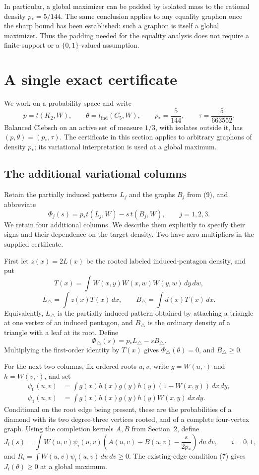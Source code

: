 \documentclass[11pt]{amsart}
\theoremstyle{definition}
\theoremstyle{remark}
\begin{document}
In particular, a global maximizer can be padded by isolated mass to the
rational density \(p_*=5/144\). The same conclusion applies to any
equality graphon once the sharp bound has been established: such a graphon
is itself a global maximizer. Thus the padding needed for the equality
analysis does not require a finite-support or a \(\{0,1\}\)-valued
assumption.

\section{A single exact certificate}

We work on a probability space and write
\[
 p=t(K_2,W),\qquad\theta=t_{\mathrm{ind}}(C_5,W),\qquad
 p_*=\frac5{144},\qquad\tau=\frac5{663552}.
\]
Balanced Clebsch on an active set of measure \(1/3\), with isolates outside
it, has \((p,\theta)=(p_*,\tau)\). The certificate in this section applies
to arbitrary graphons of density \(p_*\); its variational interpretation
is used at a global maximum.

\subsection{The additional variational columns}

Retain the partially induced patterns \(L_j\) and the graphs \(B_j\) from
(9), and abbreviate
\[
 \Phi_j(s)=p_*t(L_j,W)-s\,t(B_j,W),\qquad j=1,2,3.
\]
We retain four additional columns. We describe them explicitly to specify
their signs and their dependence on the target density. Two have zero
multipliers in the supplied certificate.

First let \(z(x)=2L(x)\) be the rooted labeled induced-pentagon density,
and put
\[
 T(x)=\int W(x,y)W(x,w)W(y,w)\,dy\,dw,
\]
\[
 L_\triangle=\int z(x)T(x)\,dx,\qquad
 B_\triangle=\int d(x)T(x)\,dx.
\]
Equivalently, \(L_\triangle\) is the partially induced pattern obtained
by attaching a triangle at one vertex of an induced pentagon, and
\(B_\triangle\) is the ordinary density of a triangle with a leaf at its
root. Define
\[
 \Phi_\triangle(s)=p_*L_\triangle-sB_\triangle.
\]
Multiplying the first-order identity by \(T(x)\) gives
\(\Phi_\triangle(\theta)=0\), and \(B_\triangle\ge0\).

For the next two columns, fix ordered roots \(u,v\), write \(g=W(u,\cdot)\)
and \(h=W(v,\cdot)\), and set
\begin{align*}
 \psi_0(u,v)&=\int g(x)h(x)g(y)h(y)(1-W(x,y))\,dx\,dy,\\
 \psi_1(u,v)&=\int g(x)h(x)g(y)h(y)W(x,y)\,dx\,dy.
\end{align*}
Conditional on the root edge being present, these are the probabilities of
a diamond with its two degree-three vertices rooted, and of a complete
four-vertex graph. Using the completion kernels \(A,B\) from Section~2,
define
\[
 J_i(s)=\int W(u,v)\psi_i(u,v)
       \left(A(u,v)-B(u,v)-\frac{s}{2p_*}\right)\,du\,dv,
       \qquad i=0,1,
\]
and \(R_i=\int W(u,v)\psi_i(u,v)\,du\,dv\ge0\).
The existing-edge condition (7) gives \(J_i(\theta)\ge0\) at a global
maximum.
\end{document}
